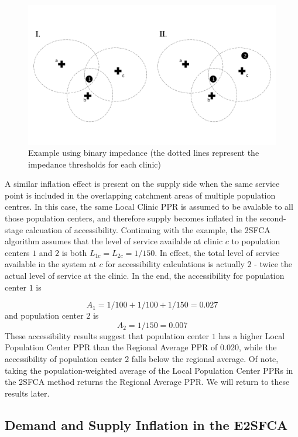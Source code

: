 \documentclass[10pt,letterpaper]{article}
\begin{document}
\begin{figure}
\centering
\includegraphics{fig1-Example1.pdf}
\caption{\label{fig:fig1-example-1}Example using binary impedance (the
dotted lines represent the impedance thresholds for each clinic)}
\end{figure}

A similar inflation effect is present on the supply side when the same
service point is included in the overlapping catchment areas of multiple
population centres. In this case, the same Local Clinic PPR is assumed
to be avalable to all those population centers, and therefore supply
becomes inflated in the second-stage calcuation of accessibility.
Continuing with the example, the 2SFCA algorithm assumes that the level
of service available at clinic \(c\) to population centers \(1\) and
\(2\) is both \(L_{1c}=L_{2c}=1/150\). In effect, the total level of
service available in the system at \(c\) for accessibility calculations
is actually \(2\) - twice the actual level of service at the clinic. In
the end, the accessibility for population center \(1\) is

\[
A_1 = 1/100 + 1/100 + 1/150 = 0.027
\] and population center \(2\) is \[
A_2 = 1/150 = 0.007
\] These accessibility results suggest that population center \(1\) has
a higher Local Population Center PPR than the Regional Average PPR of
0.020, while the accessibility of population center \(2\) falls below
the regional average. Of note, taking the population-weighted average of
the Local Population Center PPRs in the 2SFCA method returns the
Regional Average PPR. We will return to these results later.

\subsection{Demand and Supply Inflation in the
E2SFCA}\label{demand-and-supply-inflation-in-the-e2sfca}
\end{document}
